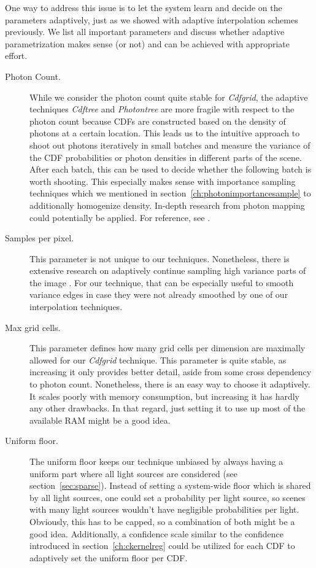 One way to address this issue is to let the system learn and decide on the parameters adaptively, just as we showed with adaptive interpolation schemes previously. We list all important parameters and discuss whether adaptive parametrization makes sense (or not) and can be achieved with appropriate effort.

\begin{description}
    \item[Photon Count.] While we consider the photon count quite stable for \textit{Cdfgrid}, the adaptive techniques \textit{Cdftree} and \textit{Photontree} are more fragile with respect to the photon count because CDFs are constructed based on the density of photons at a certain location. This leads us to the intuitive approach to shoot out photons iteratively in small batches and measure the variance of the CDF probabilities or photon densities in different parts of the scene. After each batch, this can be used to decide whether the following batch is worth shooting. This especially makes sense with importance sampling techniques which we mentioned in section~\ref{ch:photonimportancesample} to additionally homogenize density. In-depth research from photon mapping could potentially be applied. For reference, see \parencite{DBLP:journals/vc/ZhengZ15}.
    \item[Samples per pixel.] This parameter is not unique to our techniques. Nonetheless, there is extensive research on adaptively continue sampling high variance parts of the image \parencite{zwicker15star}. For our technique, that can be especially useful to smooth variance edges in case they were not already smoothed by one of our interpolation techniques.
    \item[Max grid cells.] This parameter defines how many grid cells per dimension are maximally allowed for our \textit{Cdfgrid} technique. This parameter is quite stable, as increasing it only provides better detail, aside from some cross dependency to photon count. Nonetheless, there is an easy way to choose it adaptively. It scales poorly with memory consumption, but increasing it has hardly any other drawbacks. In that regard, just setting it to use up most of the available RAM might be a good idea.
    \item[Uniform floor.] The uniform floor keeps our technique unbiased by always having a uniform part where all light sources are considered (see section~\ref{sec:sparse}). Instead of setting a system-wide floor which is shared by all light sources, one could set a probability per light source, so scenes with many light sources wouldn't have negligible probabilities per light. Obviously, this has to be capped, so a combination of both might be a good idea. Additionally, a confidence scale similar to the confidence introduced in section~\ref{ch:ckernelreg} could be utilized for each CDF to adaptively set the uniform floor per CDF.

\end{description}
